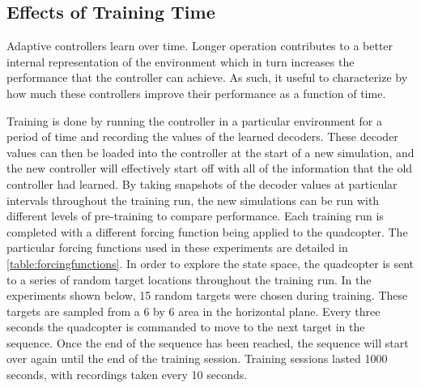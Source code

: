\documentclass[letterpaper,12pt,titlepage,oneside,final]{book}
\begin{document}
\subsection{Effects of Training Time}

Adaptive controllers learn over time.
Longer operation contributes to a better internal representation of the environment which in turn increases the performance that the controller can achieve.
As such, it useful to characterize by how much these controllers improve their performance as a function of time.

Training is done by running the controller in a particular environment for a period of time and recording the values of the learned decoders. %
These decoder values can then be loaded into the controller at the start of a new simulation, and the new controller will effectively start off with all of the information that the old controller had learned.
By taking snapshots of the decoder values at particular intervals throughout the training run, the new simulations can be run with different levels of pre-training to compare performance.
Each training run is completed with a different forcing function being applied to the quadcopter.
The particular forcing functions used in these experiments are detailed in \autoref{table:forcingfunctions}.
In order to explore the state space, the quadcopter is sent to a series of random target locations throughout the training run.
In the experiments shown below, 15 random targets were chosen during training.
These targets are sampled from a 6 by 6 area in the horizontal plane.
Every three seconds the quadcopter is commanded to move to the next target in the sequence. Once the end of the sequence has been reached, the sequence will start over again until the end of the training session. %
Training sessions lasted 1000 seconds, with recordings taken every 10 seconds. %
\end{document}
